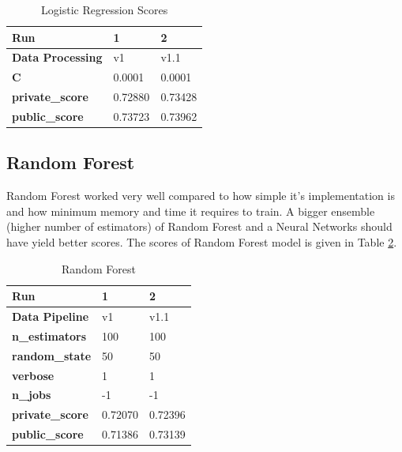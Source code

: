 \documentclass[sigconf, nonacm]{acmart}
\begin{document}
\begin{table}[h]
	\caption{Logistic Regression Scores}
	\label{tab:log_reg}
	\begin{tabular}{@{}|l|l|l|@{}}
		\toprule
		\textbf{Run}             & \textbf{1} & \textbf{2} \\ \midrule
		\textbf{Data Processing} & v1         & v1.1       \\ \midrule
		\textbf{C}               & 0.0001     & 0.0001     \\ \midrule
		\textbf{private\_score}  & 0.72880    & 0.73428    \\ \midrule
		\textbf{public\_score}   & 0.73723    & 0.73962    \\ \bottomrule
	\end{tabular}
\end{table}

\subsection{Random Forest}

Random Forest worked very well compared to how simple it's implementation is and how minimum memory and time it requires to train. A bigger ensemble (higher number of estimators) of Random Forest and a Neural Networks should have yield better scores. The scores of Random Forest model is given in Table \ref{tab:ran_for}.

\begin{table}[h]
    \caption{Random Forest}
    \label{tab:ran_for}
    \begin{tabular}{@{}|l|l|l|@{}}
        \toprule
        \textbf{Run}            & \textbf{1} & \textbf{2} \\ \midrule
        \textbf{Data Pipeline}  & v1         & v1.1       \\ \midrule
        \textbf{n\_estimators}  & 100        & 100        \\ \midrule
        \textbf{random\_state}  & 50         & 50         \\ \midrule
        \textbf{verbose}        & 1          & 1          \\ \midrule
        \textbf{n\_jobs}        & -1         & -1         \\ \midrule
        \textbf{private\_score} & 0.72070    & 0.72396    \\ \midrule
        \textbf{public\_score}  & 0.71386    & 0.73139    \\ \bottomrule
    \end{tabular}
\end{table}
\end{document}
